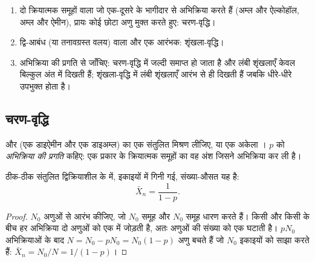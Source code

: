 \begin{method}[चरण या शृंखला?]\label{met:b2:polymer-synthesis:classify}
\begin{enumerate}
  \item दो क्रियात्मक समूहों वाला  जो एक-दूसरे के भागीदार से अभिक्रिया करते हैं (अम्ल और ऐल्कोहॉल,
        अम्ल और ऐमीन), प्रायः कोई छोटा अणु मुक्त करते हुए: चरण-वृद्धि।
  \item {} द्वि-आबंध (या तनावग्रस्त वलय) वाला  और एक आरंभक: शृंखला-वृद्धि।
  \item अभिक्रिया की प्रगति से जाँचिए: चरण-वृद्धि में  जल्दी समाप्त हो जाता है और लंबी शृंखलाएँ
        केवल बिल्कुल अंत में दिखती हैं; शृंखला-वृद्धि में लंबी शृंखलाएँ आरंभ से ही दिखती हैं जबकि 
        धीरे-धीरे उपभुक्त होता है।
\end{enumerate}
\end{method}

\subsection*{चरण-वृद्धि}

 और   (एक डाइऐमीन और एक डाइअम्ल) का एक संतुलित मिश्रण लीजिए, या एक अकेला
 । $p$ को \emph{अभिक्रिया की प्रगति} कहिए: एक प्रकार के क्रियात्मक समूहों का
वह अंश जिसने अभिक्रिया कर ली है।

\begin{theorem}[कैरोदर्स समीकरण]\label{thm:b2:polymer-synthesis:carothers}
ठीक-ठीक संतुलित द्विक्रियाशील  के  में,  इकाइयों में गिनी गई,
संख्या-औसत  यह है:
\begin{equation*}
\bar X_n = \frac{1}{1 - p}.
\end{equation*}
\end{theorem}

\begin{proof}
$N_0$  अणुओं से आरंभ कीजिए, जो $N_0$ समूह  और $N_0$ समूह  धारण करते हैं। किसी  और
किसी  के बीच हर अभिक्रिया दो अणुओं को एक में जोड़ती है, अतः अणुओं की संख्या को
एक घटाती है। $pN_0$ अभिक्रियाओं के बाद $N = N_0 - pN_0 = N_0(1-p)$ अणु बचते हैं जो $N_0$ 
इकाइयों को साझा करते हैं: $\bar X_n = N_0/N = 1/(1-p)$।
\end{proof}

